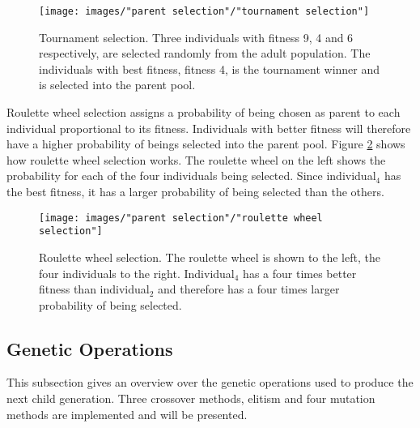 \begin{figure}[h!]
\begin{center}
\texttt{[image: images/"parent selection"/"tournament selection"]}
\caption{Tournament selection. Three individuals with fitness 9, 4 and 6 respectively, are selected randomly from the adult population. The individuals with best fitness, fitness 4, is the tournament winner and is selected into the parent pool.}
\label{figure:tournament selection}
\end{center}
\end{figure}


\noindent Roulette wheel selection assigns a probability of being chosen as parent to each individual proportional to its fitness. Individuals with better fitness will therefore have a higher probability of beings selected into the parent pool. Figure \ref{figure:roulette wheel selection} shows how roulette wheel selection works. The roulette wheel on the left shows the probability for each of the four individuals being selected. Since individual$_4$ has the best fitness, it has a larger probability of being selected than the others. \\


\begin{figure}[h!]
\begin{center}
\texttt{[image: images/"parent selection"/"roulette wheel selection"]}
\caption{Roulette wheel selection. The roulette wheel is shown to the left, the four individuals to the right. Individual$_4$ has a four times better fitness than individual$_2$ and therefore has a four times larger probability of being selected.}
\label{figure:roulette wheel selection}
\end{center}
\end{figure}


\subsection{Genetic Operations}\label{subsection:genetic operations}
This subsection gives an overview over the genetic operations used to produce the next child generation. Three crossover methods, elitism and four mutation methods are implemented and will be presented. 


